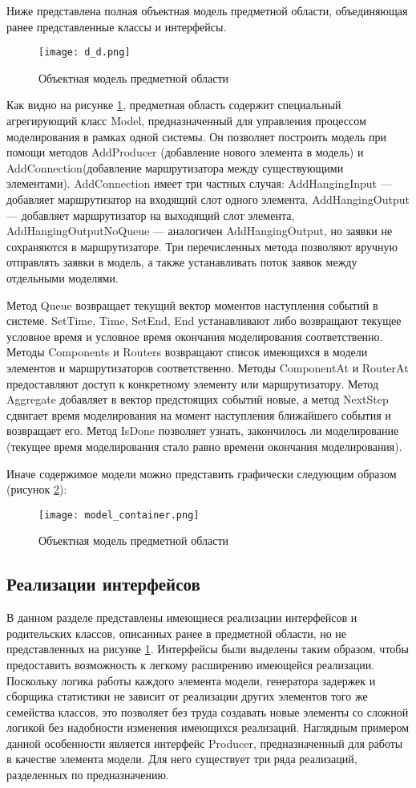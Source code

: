 Ниже представлена полная объектная модель предметной области, объединяющая ранее представленные классы и интерфейсы.
\begin{figure}[H]
	\centering
	\texttt{[image: d\_d.png]}
	\caption{Объектная модель предметной области}
	\label{d_d}
\end{figure}

Как видно на рисунке \ref{d_d}, предметная область содержит специальный агрегирующий класс Model, предназначенный для управления процессом моделирования в рамках одной системы. Он позволяет построить модель при помощи методов AddProducer (добавление нового элемента в модель) и AddConnection(добавление маршрутизатора между существующими элементами). AddConnection имеет три частных случая: AddHangingInput --- добавляет маршрутизатор на входящий слот одного элемента, AddHangingOutput --- добавляет маршрутизатор на выходящий слот элемента, AddHangingOutputNoQueue --- аналогичен AddHangingOutput, но заявки не сохраняются в маршрутизаторе. Три перечисленных метода позволяют вручную отправлять заявки в модель, а также устанавливать поток заявок между отдельными моделями.

Метод Queue возвращает текущий вектор моментов наступления событий в системе. SetTime, Time, SetEnd, End устанавливают либо возвращают текущее условное время и условное время окончания моделирования соответственно. Методы Components и Routers возвращают список имеющихся в модели элементов и маршрутизаторов соответственно. Методы ComponentAt и RouterAt предоставляют доступ к конкретному элементу или маршрутизатору. Метод Aggregate добавляет в вектор предстоящих событий новые, а метод NextStep сдвигает время моделирования на момент наступления ближайшего события и возвращает его. Метод IsDone позволяет узнать, закончилось ли моделирование (текущее время моделирования стало равно времени окончания моделирования).

Иначе содержимое модели можно представить графически следующим образом (рисунок \ref{model_container}):
\begin{figure}[H]
	\centering
	\texttt{[image: model\_container.png]}
	\caption{Объектная модель предметной области}
	\label{model_container}
\end{figure}

\subsection{Реализации интерфейсов}
В данном разделе представлены имеющиеся реализации интерфейсов и родительских классов, описанных ранее в предметной области, но не представленных на рисунке \ref{d_d}. Интерфейсы были выделены таким образом, чтобы предоставить возможность к легкому расширению имеющейся реализации. Поскольку логика работы каждого элемента модели, генератора задержек и сборщика статистики не зависит от реализации других элементов того же семейства классов, это позволяет без труда создавать новые элементы со сложной логикой без надобности изменения имеющихся реализаций. Наглядным примером данной особенности является интерфейс Producer, предназначенный для работы в качестве элемента модели. Для него существует три ряда реализаций, разделенных по предназначению. 

